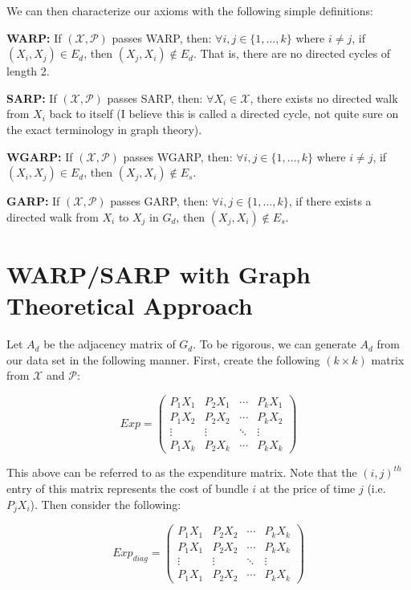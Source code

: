 \documentclass{article} %
\begin{document}
We can then characterize our axioms with the following simple definitions:


\textbf{WARP:} If $(\mathcal{X},\mathcal{P})$ passes WARP, then: $\forall i,j\in\{1,\dots,k\}$ where $i\not=j$, if $(X_i,X_j)\in E_d$, then $(X_j, X_i)\not\in E_d$.  That is, there are no directed cycles of length 2.


\textbf{SARP:} If $(\mathcal{X},\mathcal{P})$ passes SARP, then: $\forall X_i \in \mathcal{X}$, there exists no directed walk from $X_i$ back to itself (I believe this is called a directed cycle, not quite sure on the exact terminology in graph theory).


\textbf{WGARP:} If $(\mathcal{X},\mathcal{P})$ passes WGARP, then: $\forall i,j\in\{1,\dots,k\}$ where $i\not=j$, if $(X_i,X_j)\in E_d$, then $(X_j, X_i)\not\in E_s$.


\textbf{GARP:} If $(\mathcal{X},\mathcal{P})$ passes GARP, then: $\forall i,j\in\{1,\dots,k\}$, if there exists a directed walk from $X_i$ to $X_j$ in $G_d$, then $(X_j,X_i)\not\in E_s$.


\section{WARP/SARP with Graph Theoretical Approach}

Let $A_d$ be the adjacency matrix  of $G_d$. To be rigorous, we can generate $A_d$ from our data set in the following manner. First, create the following $(k\times k)$ matrix from $\mathcal{X}$ and $\mathcal{P}$:

\[
Exp = 
 \begin{pmatrix}
  P_1X_1 & P_2X_1 & \cdots & P_kX_1 \\
  P_1X_2 & P_2X_2 & \cdots & P_kX_2 \\
  \vdots  & \vdots  & \ddots & \vdots  \\
  P_1X_k & P_2X_k & \cdots & P_kX_k
 \end{pmatrix}
\]

This above can be referred to as the expenditure matrix. Note that the $(i,j)^{th}$ entry of this matrix represents the cost of bundle $i$ at the price of time $j$ (i.e. $P_jX_i$). Then consider the following:

\[
Exp_{diag} = 
 \begin{pmatrix}
  P_1X_1 & P_2X_2 & \cdots & P_kX_k \\
  P_1X_1 & P_2X_2 & \cdots & P_kX_k \\
  \vdots  & \vdots  & \ddots & \vdots  \\
  P_1X_1 & P_2X_2 & \cdots & P_kX_k
 \end{pmatrix}
\]
\end{document}
